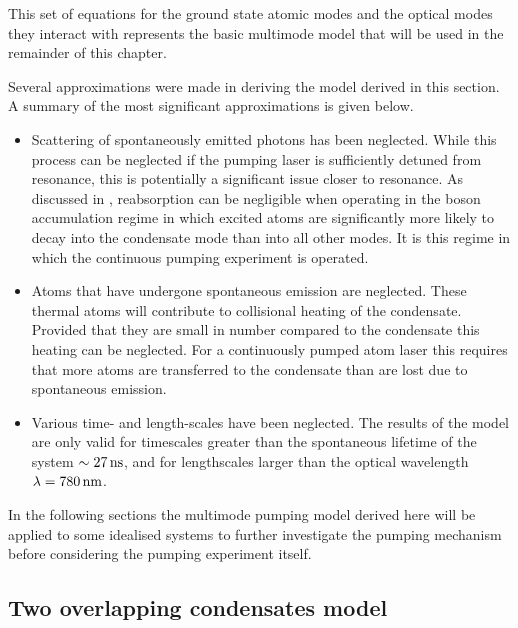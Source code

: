 This set of equations for the ground state atomic modes and the optical modes they interact with represents the basic multimode model that will be used in the remainder of this chapter.

\parasep

Several approximations were made in deriving the model derived in this section.  A summary of the most significant approximations is given below.
\begin{itemize}
    \item Scattering of spontaneously emitted photons has been neglected.  While this process can be neglected if the pumping laser is sufficiently detuned from resonance, this is potentially a significant issue closer to resonance.  As discussed in , reabsorption can be negligible when operating in the boson accumulation regime in which excited atoms are significantly more likely to decay into the condensate mode than into all other modes.  It is this regime in which the continuous pumping experiment is operated.
    \item Atoms that have undergone spontaneous emission are neglected.  These thermal atoms will contribute to collisional heating of the condensate.  Provided that they are small in number compared to the condensate this heating can be neglected.  For a continuously pumped atom laser this requires that more atoms are transferred to the condensate than are lost due to spontaneous emission.
    \item Various time- and length-scales have been neglected.  The results of the model are only valid for timescales greater than the spontaneous lifetime of the system $\sim \unit[27]{ns}$, and for lengthscales larger than the optical wavelength $\lambda = \unit[780]{nm}$.
\end{itemize}

In the following sections the multimode pumping model derived here will be applied to some idealised systems to further investigate the pumping mechanism before considering the pumping experiment itself.

\subsection{Two overlapping condensates model}
\label{OpticalPumping:SimpleModels:OverlappingCondensatesModel}

